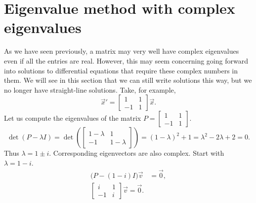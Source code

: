 \section{Eigenvalue method with complex eigenvalues}
\label{eigenmethod-cplx:section}



As we have seen previously, a matrix may very well have complex eigenvalues even if all the entries are
real. However, this may seem concerning going forward into solutions to differential equations that require these complex numbers in them. We will see in this section that we can still write solutions this way, but we no longer have straight-line solutions.  Take, for example,
\begin{equation*}
{\vec{x}}' = 
\begin{bmatrix}
1 & 1 \\
-1 & 1
\end{bmatrix}
\vec{x} .
\end{equation*}
Let us compute the eigenvalues of
the matrix $P = \left[ \begin{smallmatrix} 1 & 1 \\ -1 & 1 \end{smallmatrix}
\right]$.
\begin{equation*}
\det(P - \lambda I) =
\det\left(
\begin{bmatrix}
1-\lambda & 1 \\
-1 & 1-\lambda
\end{bmatrix}
\right)
= {(1-\lambda)}^2 + 1
= \lambda^2 - 2 \lambda + 2 = 0 .
\end{equation*}
Thus $\lambda = 1 \pm i$.
Corresponding eigenvectors are also complex.
Start with $\lambda = 1-i$.
\begin{align*}
\bigl(P-(1-i) I\bigr) \vec{v} & = \vec{0} , \\
\begin{bmatrix}
i & 1 \\
-1 & i
\end{bmatrix}
\vec{v} = \vec{0}.
\end{align*}
